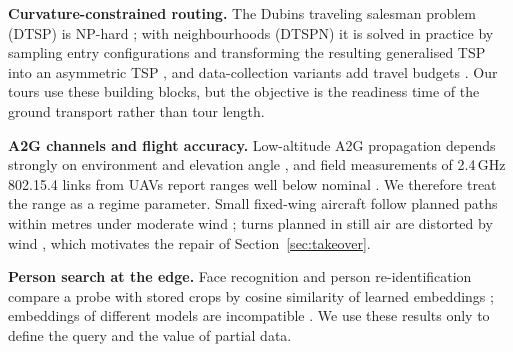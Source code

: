 \textbf{Curvature-constrained routing.} The Dubins traveling salesman problem (DTSP) is NP-hard \cite{leny2012}; with
neighbourhoods (DTSPN) it is solved in practice by sampling entry configurations and transforming the resulting
generalised TSP into an asymmetric TSP \cite{isaacs2011,noon1993,obermeyer2009}, and data-collection variants add travel
budgets \cite{penicka2019}. Our tours use these building blocks, but the objective is the readiness time of the ground
transport rather than tour length.

\textbf{A2G channels and flight accuracy.} Low-altitude A2G propagation depends strongly on environment and elevation
angle \cite{khawaja2019,alhourani2014,matolak2017}, and field measurements of 2.4\,GHz 802.15.4 links from UAVs report
ranges well below nominal \cite{nekrasov2019}. We therefore treat the range as a regime parameter. Small fixed-wing
aircraft follow planned paths within metres under moderate wind \cite{park2007,nelson2007}; turns planned in still air
are distorted by wind \cite{techy2009}, which motivates the repair of Section~\ref{sec:takeover}.

\textbf{Person search at the edge.} Face recognition and person re-identification compare a probe with stored crops by
cosine similarity of learned embeddings \cite{schroff2015,deng2019,ye2022}; embeddings of different models are
incompatible \cite{shen2020}. We use these results only to define the query and the value of partial data.
